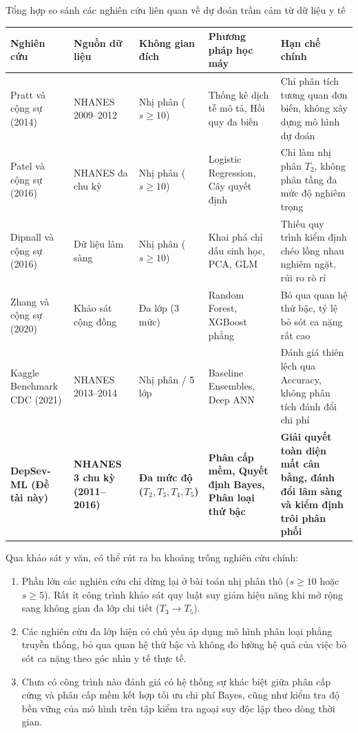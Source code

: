 \begin{table}{Tổng hợp so sánh các nghiên cứu liên quan về dự đoán trầm cảm từ dữ liệu y tế}
\centering
\footnotesize
\setlength{\tabcolsep}{3pt}
\label{tab:related-works}
\begin{tabularx}{\textwidth}{p{3.2cm} p{2.2cm} p{2.4cm} p{2.8cm} X}
\toprule
\textbf{Nghiên cứu} & \textbf{Nguồn dữ liệu} & \textbf{Không gian đích} & \textbf{Phương pháp học máy} & \textbf{Hạn chế chính} \\
\midrule
Pratt và cộng sự (2014) \cite{pratt1991discriminant} & NHANES 2009--2012 & Nhị phân ($s \ge 10$) & Thống kê dịch tễ mô tả, Hồi quy đa biến & Chỉ phân tích tương quan đơn biến, không xây dựng mô hình dự đoán \\
\midrule
Patel và cộng sự (2016) & NHANES đa chu kỳ & Nhị phân ($s \ge 10$) & Logistic Regression, Cây quyết định & Chỉ làm nhị phân $T_2$, không phân tầng đa mức độ nghiêm trọng \\
\midrule
Dipnall và cộng sự (2016) & Dữ liệu lâm sàng & Nhị phân ($s \ge 10$) & Khai phá chỉ dấu sinh học, PCA, GLM & Thiếu quy trình kiểm định chéo lồng nhau nghiêm ngặt, rủi ro rò rỉ \\
\midrule
Zhang và cộng sự (2020) & Khảo sát cộng đồng & Đa lớp (3 mức) & Random Forest, XGBoost phẳng & Bỏ qua quan hệ thứ bậc, tỷ lệ bỏ sót ca nặng rất cao \\
\midrule
Kaggle Benchmark CDC (2021) & NHANES 2013--2014 & Nhị phân / 5 lớp & Baseline Ensembles, Deep ANN & Đánh giá thiên lệch qua Accuracy, không phân tích đánh đổi chi phí \\
\midrule
\textbf{DepSev-ML (Đề tài này)} & \textbf{NHANES 3 chu kỳ (2011--2016)} & \textbf{Đa mức độ ($T_2, T_3, T_4, T_5$)} & \textbf{Phân cấp mềm, Quyết định Bayes, Phân loại thứ bậc} & \textbf{Giải quyết toàn diện mất cân bằng, đánh đổi lâm sàng và kiểm định trôi phân phối} \\
\bottomrule
\end{tabularx}
\end{table}

Qua khảo sát y văn, có thể rút ra ba khoảng trống nghiên cứu chính:
\begin{enumerate}
    \item Phần lớn các nghiên cứu chỉ dừng lại ở bài toán nhị phân thô ($s \ge 10$ hoặc $s \ge 5$). Rất ít công trình khảo sát quy luật suy giảm hiệu năng khi mở rộng sang không gian đa lớp chi tiết ($T_3 \to T_5$).
    \item Các nghiên cứu đa lớp hiện có chủ yếu áp dụng mô hình phân loại phẳng truyền thống, bỏ qua quan hệ thứ bậc và không đo lường hệ quả của việc bỏ sót ca nặng theo góc nhìn y tế thực tế.
    \item Chưa có công trình nào đánh giá có hệ thống sự khác biệt giữa phân cấp cứng và phân cấp mềm kết hợp tối ưu chi phí Bayes, cũng như kiểm tra độ bền vững của mô hình trên tập kiểm tra ngoại suy độc lập theo dòng thời gian.
\end{enumerate}

